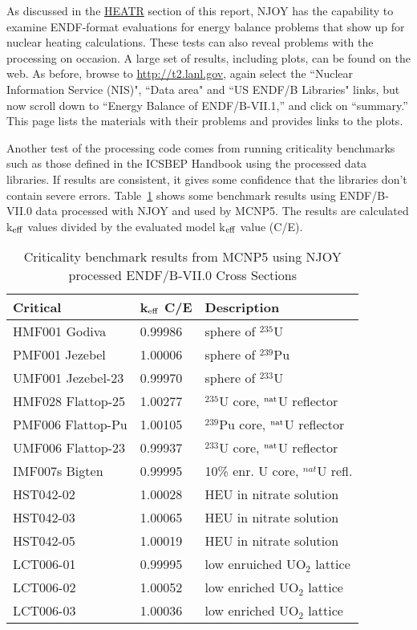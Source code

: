 As discussed in the \hyperlink{sHEATRhy}{HEATR} section of this
report, NJOY has the capability to examine ENDF-format evaluations
for energy balance problems that show up for nuclear heating
calculations.  These tests can also reveal problems with the
processing on occasion.  A large set of results, including plots,
can be found on the web.  As before, browse to
\href{http://t2.lanl.gov}{http://t2.lanl.gov}, again select
the ``Nuclear Information Service (NIS)", ``Data area"
and ``US ENDF/B Libraries" links, but now
scroll down to ``Energy Balance of ENDF/B-VII.1,'' and click on
``summary.''  This page lists the materials with their problems
and provides links to the plots.

Another test of the processing code comes from running
criticality benchmarks such as those defined in the ICSBEP
Handbook\cite{ICSBEP} using the processed data
libraries.  If results are consistent, it gives some confidence
that the libraries don't contain severe errors.  Table~\ref{crits1}
shows some benchmark results using ENDF/B-VII.0 data processed
with NJOY and used by MCNP5.  The results are calculated
k$_{\rm eff}$ values divided by the evaluated model
k$_{\rm eff}$ value (C/E).

\begin{table}[thbp]
\caption[Criticality benchmark results from MCNP5 with NJOY processed \newline
 ENDF/B-VII.0 data]{Criticality benchmark results from MCNP5 using NJOY
 processed ENDF/B-VII.0 Cross Sections}
\setlength{\extrarowheight}{1pt}
\begin{center}
\begin{tabular}{lll}
Critical & k$_{\rm eff}$ C/E & Description \\ \hline
HMF001 Godiva & 0.99986 & sphere of $^{235}$U \\
PMF001 Jezebel & 1.00006 & sphere of $^{239}$Pu \\
UMF001 Jezebel-23 & 0.99970 & sphere of $^{233}$U \\
HMF028 Flattop-25 & 1.00277 & $^{235}$U core, $^{\rm nat}$U reflector \\
PMF006 Flattop-Pu & 1.00105 & $^{239}$Pu core, $^{\rm nat}$U reflector \\
UMF006 Flattop-23 & 0.99937 & $^{233}$U core, $^{\rm nat}$U reflector \\
IMF007s Bigten & 0.99995 & 10\% enr. U core, $^{nat}$U refl. \\
HST042-02 & 1.00028 & HEU in nitrate solution \\
HST042-03 & 1.00065 & HEU in nitrate solution \\
HST042-05 & 1.00019 & HEU in nitrate solution \\
LCT006-01 & 0.99995 & low enruiched UO$_2$ lattice \\
LCT006-02 & 1.00052 & low enriched UO$_2$ lattice \\
LCT006-03 & 1.00036 & low enriched UO$_2$ lattice \\ \hline
\end{tabular}
\end{center}
\label{crits1}
\end{table}

